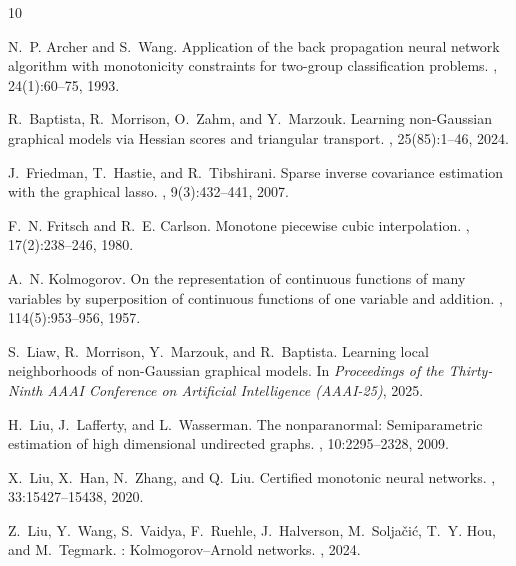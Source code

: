 \documentclass[11pt,a4paper]{article}
\theoremstyle{plain}
\theoremstyle{definition}
\theoremstyle{remark}
\begin{document}

\begin{thebibliography}{10}

N.~P. Archer and S.~Wang.
\newblock Application of the back propagation neural network algorithm with monotonicity constraints for two-group classification problems.
, 24(1):60--75, 1993.

R.~Baptista, R.~Morrison, O.~Zahm, and Y.~Marzouk.
\newblock Learning non-{G}aussian graphical models via {H}essian scores and triangular transport.
, 25(85):1--46, 2024.

J.~Friedman, T.~Hastie, and R.~Tibshirani.
\newblock Sparse inverse covariance estimation with the graphical lasso.
, 9(3):432--441, 2007.

F.~N. Fritsch and R.~E. Carlson.
\newblock Monotone piecewise cubic interpolation.
, 17(2):238--246, 1980.

A.~N. Kolmogorov.
\newblock On the representation of continuous functions of many variables by superposition of continuous functions of one variable and addition.
, 114(5):953--956, 1957.

S.~Liaw, R.~Morrison, Y.~Marzouk, and R.~Baptista.
\newblock Learning local neighborhoods of non-{G}aussian graphical models.
\newblock In {\em Proceedings of the Thirty-Ninth AAAI Conference on Artificial Intelligence (AAAI-25)}, 2025.

H.~Liu, J.~Lafferty, and L.~Wasserman.
\newblock The nonparanormal: Semiparametric estimation of high dimensional undirected graphs.
, 10:2295--2328, 2009.

X.~Liu, X.~Han, N.~Zhang, and Q.~Liu.
\newblock Certified monotonic neural networks.
, 33:15427--15438, 2020.

Z.~Liu, Y.~Wang, S.~Vaidya, F.~Ruehle, J.~Halverson, M.~Solja{\v{c}}i{\'c}, T.~Y. Hou, and M.~Tegmark.
: {K}olmogorov--{A}rnold networks.
, 2024.


\end{thebibliography}
\end{document}
